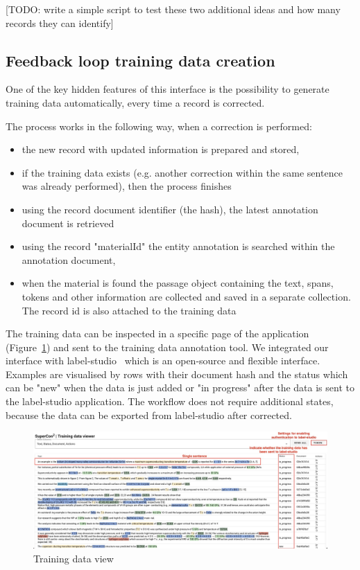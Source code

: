 \documentclass[a4paper]{article}
\begin{document}
[TODO: write a simple script to test these two additional ideas and how many records they can identify]

\subsection{Feedback loop training data creation}

One of the key hidden features of this interface is the possibility to generate training data automatically, every time a record is corrected. 

The process works in the following way, when a correction is performed:
\begin{itemize}
    \item the new record with updated information is prepared and stored, 
    \item if the training data exists (e.g. another correction within the same sentence was already performed), then the process finishes
    \item using the record document identifier (the hash), the latest annotation document is retrieved
    \item using the record "materialId" the entity annotation is searched within the annotation document,
    \item when the material is found the passage object containing the text, spans, tokens and other information are collected and saved in a separate collection. The record id is also attached to the training data 
\end{itemize}

The training data can be inspected in a specific page of the application (Figure~\ref{fig:training-data-view}) and sent to the training data annotation tool. We integrated our interface with label-studio~\cite{Label_Studio} which is an open-source and flexible interface. 
Examples are visualised by rows with their document hash and the status which can be "new" when the data is just added or "in progress" after the data is sent to the label-studio application. 
The workflow does not require additional states, because the data can be exported from label-studio after corrected. 


\begin{figure}[h]
  \centering
  \includegraphics[width=1\textwidth]{images/training-data-viewer} 
  \caption{Training data view}
  \label{fig:training-data-view}
\end{figure}
\end{document}
